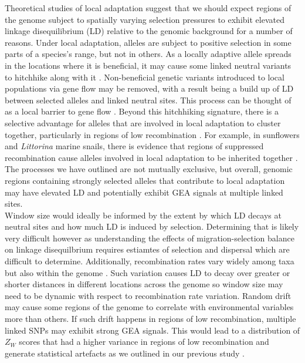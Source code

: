 \documentclass[10pt,twoside,lineno, twocolumn]{GSA_format}
\begin{document}
Theoretical studies of local adaptation suggest that we should expect regions of the genome subject to spatially varying selection pressures to exhibit elevated linkage disequilibrium (LD) relative to the genomic background for a number of reasons. Under local adaptation, alleles are subject to positive selection in some parts of a species's range, but not in others. As a locally adaptive allele spreads in the locations where it is beneficial, it may cause some linked neutral variants to hitchhike along with it \citep{Sakamoto2019}. Non-beneficial genetic variants introduced to local populations via gene flow may be removed, with a result being a build up of LD between selected alleles and linked neutral sites. This process can be thought of as a local barrier to gene flow \citep{Barton1986}. Beyond this hitchhiking signature, there is a selective advantage for alleles that are involved in local adaptation to cluster together, particularly in regions of low recombination \citep{Rieseberg2001, Noor2001, Kirkpatrick2006, Yeaman2013}. For example, in sunflowers and \textit{Littorina} marine snails, there is evidence that regions of suppressed recombination cause alleles involved in local adaptation to be inherited together \citep{Morales2019, Todesco2020}. The processes we have outlined are not mutually exclusive, but overall, genomic regions containing strongly selected alleles that contribute to local adaptation may have elevated LD and potentially exhibit GEA signals at multiple linked sites.\\

Window size would ideally be informed by the extent by which LD decays at neutral sites and how much LD is induced by selection. Determining that is likely very difficult however as understanding the effects of migration-selection balance on linkage disequilbrium requires estiamtes of selection and dispersal which are difficult to determine. Additionally, recombination rates vary widely among taxa but also within the genome \citep{Stapley2017}. Such variation causes LD to decay over greater or shorter distances in different locations across the genome so window size may need to be dynamic with respect to recombination rate variation. Random drift may cause some regions of the genome to correlate with environmental variables more than others. If such drift happens in regions of low recombination, multiple linked SNPs may exhibit strong GEA signals. This would lead to a distribution of $Z_W$ scores that had a higher variance in regions of low recombination and generate statistical artefacts as we outlined in our previous study \citep{Booker2020}. 
\end{document}

